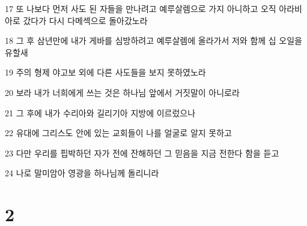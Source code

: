 \par 17 또 나보다 먼저 사도 된 자들을 만나려고 예루살렘으로 가지 아니하고 오직 아라비아로 갔다가 다시 다메섹으로 돌아갔노라
\par 18 그 후 삼년만에 내가 게바를 심방하려고 예루살렘에 올라가서 저와 함께 십 오일을 유할새
\par 19 주의 형제 야고보 외에 다른 사도들을 보지 못하였노라
\par 20 보라 내가 너희에게 쓰는 것은 하나님 앞에서 거짓말이 아니로라
\par 21 그 후에 내가 수리아와 길리기아 지방에 이르렀으나
\par 22 유대에 그리스도 안에 있는 교회들이 나를 얼굴로 알지 못하고
\par 23 다만 우리를 핍박하던 자가 전에 잔해하던 그 믿음을 지금 전한다 함을 듣고
\par 24 나로 말미암아 영광을 하나님께 돌리니라

\chapter{2}

